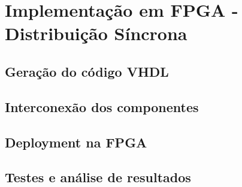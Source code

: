 \section{Implementação em FPGA - Distribuição Síncrona}

\subsection{Geração do código VHDL}

\subsection{Interconexão dos componentes}

\subsection{Deployment na FPGA}

\subsection{Testes e análise de resultados}
